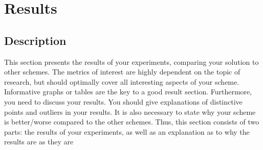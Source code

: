 \section{Results}
\label{sec:results}
\subsection{Description}
This section presents the results of your experiments,
comparing your solution to other schemes. The metrics of
interest are highly dependent on the topic of research, but
should optimally cover all interesting aspects of your scheme.
Informative graphs or tables are the key to a good result
section.
Furthermore, you need to discuss your results. You should
give explanations of distinctive points and outliers in your
results. It is also necessary to state why your scheme is
better/worse compared to the other schemes. Thus, this section
consists of two parts: the results of your experiments, as well
as an explanation as to why the results are as they are

